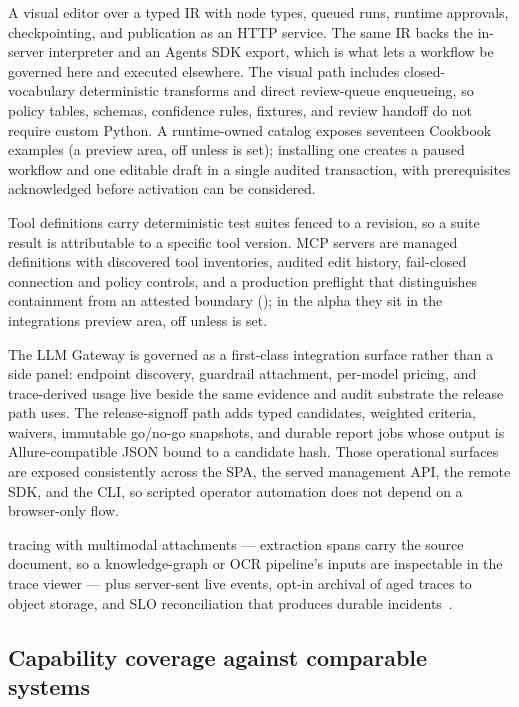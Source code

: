  A visual editor over a typed IR with \statNodeTypes{} node types,
queued runs, runtime approvals, checkpointing, and publication as an HTTP service.
The same IR backs the in-server interpreter and an Agents SDK export, which is what
lets a workflow be governed here and executed elsewhere.  The visual path includes
closed-vocabulary deterministic transforms and direct review-queue enqueueing, so
policy tables, schemas, confidence rules, fixtures, and review handoff do not require
custom Python.  A runtime-owned catalog exposes seventeen Cookbook examples (a preview area, off
unless  is set); installing
one creates a paused workflow and one editable draft in a single audited transaction,
with prerequisites acknowledged before activation can be considered.

 Tool definitions carry deterministic test suites
fenced to a revision, so a suite result is attributable to a specific tool version.
MCP servers are managed definitions with discovered tool inventories, audited edit
history, fail-closed connection and policy controls, and a production preflight
that distinguishes containment from an attested boundary
(); in the alpha they sit in the integrations preview area,
off unless  is set.

 The LLM Gateway is governed as a
first-class integration surface rather than a side panel: endpoint discovery,
guardrail attachment, per-model pricing, and trace-derived usage live beside the
same evidence and audit substrate the release path uses. The release-signoff path
adds typed candidates, weighted criteria, waivers, immutable go/no-go snapshots,
and durable report jobs whose output is Allure-compatible JSON bound to a
candidate hash. Those operational surfaces are exposed consistently across the SPA,
the served management API, the remote SDK, and the CLI, so scripted operator
automation does not depend on a browser-only flow.

 \mlflow{} tracing with multimodal attachments --- extraction
spans carry the source document, so a knowledge-graph or OCR pipeline's inputs are
inspectable in the trace viewer --- plus server-sent live events, opt-in archival of
aged traces to object storage, and SLO reconciliation that produces durable
incidents~\cite{beyer2016sre}.

\subsection{Capability coverage against comparable systems}

